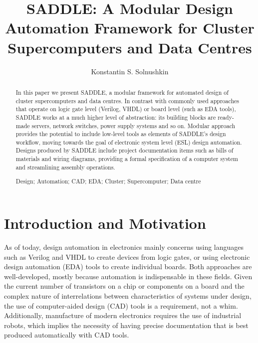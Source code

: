 \documentclass[runningheads,a4paper]{llncs}
\newcommand{\keywords}[1]{\par\addvspace\baselineskip
\noindent\keywordname\enspace\ignorespaces#1}
\begin{document}
\mainmatter  
\title{SADDLE: A Modular Design Automation Framework for Cluster Supercomputers and Data Centres}


\author{Konstantin S. Solnushkin}



\maketitle


\begin{abstract}
In this paper we present SADDLE, a modular framework for automated design of cluster supercomputers and data centres. In contrast with commonly used approaches that operate on logic gate level (Verilog, VHDL) or board level (such as EDA tools), SADDLE works at a much higher level of abstraction: its building blocks are ready-made servers, network switches, power supply systems and so on. Modular approach provides the potential to include low-level tools as elements of SADDLE's design workflow, moving towards the goal of electronic system level (ESL) design automation. Designs produced by SADDLE include project documentation items such as bills of materials and wiring diagrams, providing a formal specification of a computer system and streamlining assembly operations.

\keywords{Design; Automation; CAD; EDA; Cluster; Supercomputer; Data centre}
\end{abstract}


\section{Introduction and Motivation}

As of today, design automation in electronics mainly concerns using languages such as Verilog and VHDL to create devices from logic gates, or using electronic design automation (EDA) tools to create individual boards. Both approaches are well-developed, mostly because automation is indispensable in these fields. Given the current number of transistors on a chip or components on a board and the complex nature of interrelations between characteristics of systems under design, the use of computer-aided design (CAD) tools is a requirement, not a whim. Additionally, manufacture of modern electronics requires the use of industrial robots, which implies the necessity of having precise documentation that is best produced automatically with CAD tools.
\end{document}
